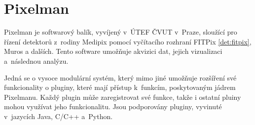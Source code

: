\section{Pixelman}\label{det:pixelman}
Pixelman \cite{pixelman} je softwarový balík, vyvíjený v~ÚTEF ČVUT v~Praze, sloužící pro řízení detektorů z~rodiny Medipix pomocí vyčítacího rozhraní FITPix \ref{det:fitpix}, Muros a dalších. Tento software umožňuje akvizici dat, jejich vizualizaci a~následnou analýzu.

Jedná se o vysoce modulární systém, který mimo jiné umožňuje rozšíření své funkcionality o pluginy, které mají přístup k~funkcím, poskytovaným jádrem Pixelmanu. Každý plugin může zaregistrovat své funkce, takže i ostatní pluiny mohou využívat jeho funkcionalitu. Jsou podporovány pluginy, vyvinuté v~jazycích Java, C/C++ a~Python. 





